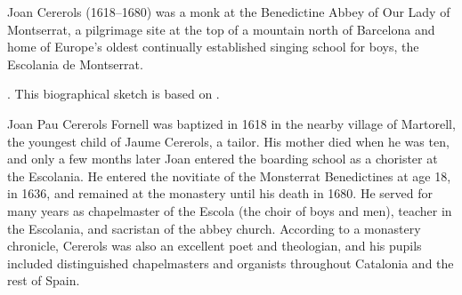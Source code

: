 
\begin{notesources}

\begin{source}
\end{source}

\begin{source}
\end{source}

\begin{source}
\end{source}

\end{notesources}

Joan Cererols (1618--1680) was a monk at the Benedictine Abbey of Our Lady of
Montserrat, a pilgrimage site at the top of a mountain north of Barcelona and
home of Europe's oldest continually established singing school for boys, the
Escolania de Montserrat.%
\begin{Footnote}
    \Autocite[227--284]{Cashner:PhD}.
    This biographical sketch is based on 
    \autocites{Estrada:CererolsBio}{Balanza:CererolsFamily}.
\end{Footnote}
Joan Pau Cererols Fornell was baptized in 1618 in the nearby village of
Martorell, the youngest child of Jaume Cererols, a tailor.
His mother died when he was ten, and only a few months later Joan entered the
boarding school as a chorister at the Escolania.
He entered the novitiate of the Monsterrat Benedictines at age 18, in 1636, and
remained at the monastery until his death in 1680.
He served for many years as chapelmaster of the Escola (the choir of boys and
men), teacher in the Escolania, and sacristan of the abbey church.
According to a monastery chronicle, Cererols was also an excellent poet and
theologian, and his pupils included distinguished chapelmasters and organists
throughout Catalonia and the rest of Spain.

